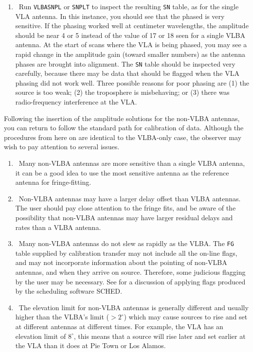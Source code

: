 \begin{enumerate}
\item\ {Run {\tt VLBASNPL} or {\tt SNPLT} to inspect the resulting
{\tt SN} table, as for the single VLA
antenna.  In this instance, you should see that the phased 
is very sensitive.  If the phasing worked well at centimeter
wavelengths, the amplitude should be near 4 or 5 instead of the value
of 17 or 18 seen for a single VLBA antenna.  At the start of scans
where the VLA is being phased, you may see a rapid change in the
amplitude gain (toward smaller numbers) as the antenna phases are
brought into alignment. The {\tt SN} table should be inspected very
carefully, because there may be data that should be flagged when the
VLA phasing did not work well.  Three possible reasons for poor
phasing are (1) the source is too weak; (2) the troposphere is
misbehaving; or (3) there was radio-frequency interference at the
VLA\@.}

\end{enumerate}

Following the insertion of the amplitude solutions for the non-VLBA
antennas, you can return to follow the standard path for calibration
of  data.  Although the procedures from here on are identical
to the VLBA-only case, the observer may wish to pay attention to several
issues.

\begin{enumerate}

\item\ {Many non-VLBA antennas are more sensitive than a single VLBA
antenna, it can be a good idea to use the most sensitive antenna as the
reference antenna for fringe-fitting.}

\item\ {Non-VLBA antennas may have a larger delay offset than VLBA
antennas.  The user should pay close attention to the fringe
fits, and be aware of the possibility that non-VLBA antennas may have
larger residual delays and rates than a VLBA antenna.}

\item\ {Many non-VLBA antennas do not slew as rapidly as the VLBA\@.
The {\tt FG} table supplied by calibration transfer may not include all
the on-line flags, and may not incorporate information about the pointing
of non-VLBA antennas, and when they arrive on source.  Therefore, some
judicious flagging by the user may be necessary.  See  for
a discussion of applying flags produced by the scheduling software SCHED.}

\item\ {The elevation limit for non-VLBA antennas is generally different
and usually higher than the VLBA's limit ($> 2^\circ$)  which may
cause sources to rise and set at different antennas at different times.
For example, the VLA has an elevation limit of  $8^\circ$, this means that a source
will rise later and set earlier at the VLA than it does at Pie Town or Los Alamos.}

\end{enumerate}


